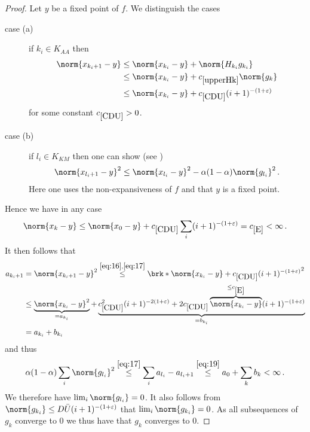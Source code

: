\begin{proof}
Let $y$ be a fixed point of $f$. We distinguish the cases
\begin{description}
	\item[case (a)]
	if $k_i\in K_{AA}$ then
	\begin{equation}
	\begin{aligned}
		\norm{x_{k_i+1}-y}&\leq \norm{x_{k_i}-y}+\norm{H_{k_i}g_{k_i}} \\
		&\leq \norm{x_{k_i}-y}+\useconstant{upperHk}\norm{g_k} \\
		&\leq \norm{x_{k_i}-y}+\useconstant{CDU}(i+1)^{-(1+\e)}
		\label{eq:16}
	\end{aligned}
	\end{equation}
	for some constant $\useconstant{CDU}>0$.
	\item[case (b)]
	if $l_i\in K_{KM}$ then one can show (see \cite[Theorem 6]{ZhaAA})
	\begin{align}
		\norm{x_{l_i+1}-y}^2\leq \norm{x_{l_i}-y}^2-\alpha(1-\alpha)\norm{g_{l_i}}^2
		\label{eq:17}\,.
	\end{align}
	Here one uses the non-expansiveness of $f$ and that $y$ is a fixed point.
\end{description}
Hence we have in any case
\begin{align*}
	\norm{x_k-y}
	\leq \norm{x_0-y}+\useconstant{CDU}\sum_i(i+1)^{-(1+\e)}
	= \useconstant{E}<\infty\,.
\end{align*}
It then follows that
\begin{equation}
\begin{aligned}
	a_{{k_i}+1} &= \norm{x_{{k_i}+1}-y}^2\stackrel{\eqref{eq:16}, \eqref{eq:17}}{\leq}\brk*{\norm{x_{k_i}-y}+\useconstant{CDU}(i+1)^{-(1+\e)}}^2 \\
	&\leq \underbrace{\norm{x_{k_i}-y}^2}_{=a_{k_i}}+\underbrace{\useconstant{CDU}^2(i+1)^{-2(1+\e)}+2\useconstant{CDU}\overbrace{\norm{x_{k_i}-y}}^{\leq \useconstant{E}}(i+1)^{-(1+\e)}}_{=b_{k_i}} \\
	&= a_{k_i}+b_{k_i}
\end{aligned}
\label{eq:19}
\end{equation}
and thus
\begin{align*}
	\alpha(1-\alpha)\sum_i\norm{g_{l_i}}^2
	\stackrel{\eqref{eq:17}}{\leq} \sum_i a_{l_i}-a_{l_i+1}
	\stackrel{\eqref{eq:19}}{\leq}a_0+\sum_k b_k
	<\infty\,.
\end{align*}
We therefore have $\lim_i\norm{g_{l_i}}=0$. It also follows from $\norm{g_{k_i}}\leq D\barU (i+1)^{-(1+\e)}$ that $\lim_i\norm{g_{k_i}}=0$. As all subsequences of $g_k$ converge to $0$ we thus have that $g_k$ converges to $0$.


\end{proof}
